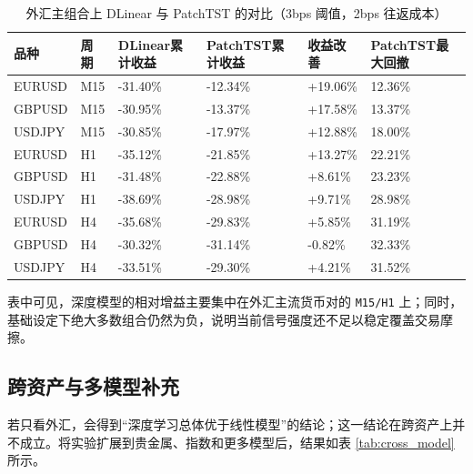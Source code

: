 \documentclass[11pt,a4paper]{ctexart}
\begin{document}
\begin{table}[htbp]
\centering
\caption{外汇主组合上 DLinear 与 PatchTST 的对比（3bps 阈值，2bps 往返成本）}
\label{tab:fx_compare}
\small
\begin{tabular}{C{1.8cm} C{1.2cm} C{1.8cm} C{1.8cm} C{1.6cm} C{1.6cm}}
\toprule
品种 & 周期 & DLinear累计收益 & PatchTST累计收益 & 收益改善 & PatchTST最大回撤 \\
\midrule
EURUSD & M15 & -31.40\% & -12.34\% & +19.06\% & 12.36\% \\
GBPUSD & M15 & -30.95\% & -13.37\% & +17.58\% & 13.37\% \\
USDJPY & M15 & -30.85\% & -17.97\% & +12.88\% & 18.00\% \\
EURUSD & H1  & -35.12\% & -21.85\% & +13.27\% & 22.21\% \\
GBPUSD & H1  & -31.48\% & -22.88\% & +8.61\%  & 23.23\% \\
USDJPY & H1  & -38.69\% & -28.98\% & +9.71\%  & 28.98\% \\
EURUSD & H4  & -35.68\% & -29.83\% & +5.85\%  & 31.19\% \\
GBPUSD & H4  & -30.32\% & -31.14\% & -0.82\%  & 32.33\% \\
USDJPY & H4  & -33.51\% & -29.30\% & +4.21\%  & 31.52\% \\
\bottomrule
\end{tabular}
\end{table}

表中可见，深度模型的相对增益主要集中在外汇主流货币对的 \texttt{M15/H1} 上；同时，基础设定下绝大多数组合仍然为负，说明当前信号强度还不足以稳定覆盖交易摩擦。

\subsection{跨资产与多模型补充}

若只看外汇，会得到“深度学习总体优于线性模型”的结论；这一结论在跨资产上并不成立。将实验扩展到贵金属、指数和更多模型后，结果如表 \ref{tab:cross_model} 所示。
\end{document}
